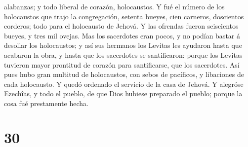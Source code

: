 alabanzas; y todo liberal de corazón, holocaustos.  Y fué
el número de los holocaustos que trajo la congregación, setenta bueyes,
cien carneros, doscientos corderos; todo para el holocausto de Jehová.
 Y las ofrendas fueron seiscientos bueyes, y tres mil
ovejas.  Mas los sacerdotes eran pocos, y no podían bastar
á desollar los holocaustos; y así sus hermanos los Levitas les ayudaron
hasta que acabaron la obra, y hasta que los sacerdotes se santificaron:
porque los Levitas tuvieron mayor prontitud de corazón para
santificarse, que los sacerdotes.  Así pues hubo gran
multitud de holocaustos, con sebos de pacíficos, y libaciones de cada
holocausto. Y quedó ordenado el servicio de la casa de Jehová.
 Y alegróse Ezechîas, y todo el pueblo, de que Dios hubiese
preparado el pueblo; porque la cosa fué prestamente hecha.

\hypertarget{section-29}{%
\section{30}\label{section-29}}

